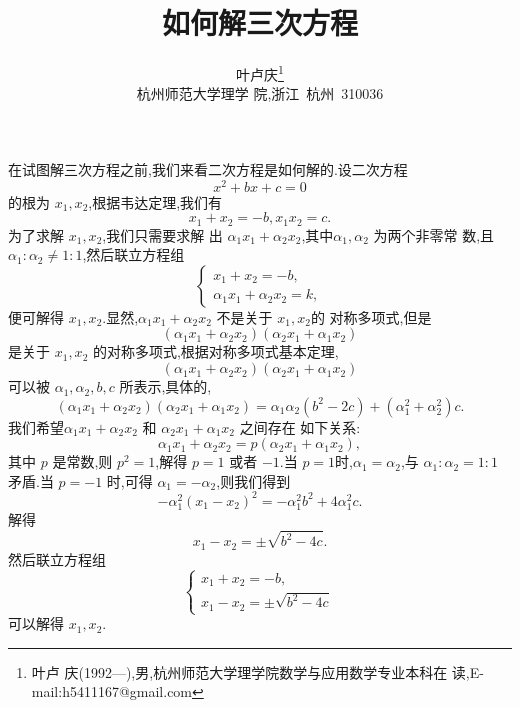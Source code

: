\documentclass[a4paper]{article}
\begin{document}
\title{\huge{\bf{如何解三次方程}}} \author{\small{叶卢庆\footnote{叶卢
      庆(1992---),男,杭州师范大学理学院数学与应用数学专业本科在
      读,E-mail:h5411167@gmail.com}}\\{\small{杭州师范大学理学
      院,浙江~杭州~310036}}}
\maketitle
在试图解三次方程之前,我们来看二次方程是如何解的.设二次方程
$$
x^2+bx+c=0
$$
的根为 $x_1,x_2$,根据韦达定理,我们有
$$
x_1+x_2=-b,x_1x_2=c.
$$
为了求解 $x_1,x_2$,我们只需要求解
出 $\alpha_1x_1+\alpha_2x_2$,其中$\alpha_1,\alpha_2$ 为两个非零常
数,且$\alpha_1:\alpha_2\neq 1:1$,然后联立方程组
$$
\begin{cases}
  x_1+x_2=-b,\\
  \alpha_1x_1+\alpha_2x_2=k,
\end{cases}
$$
便可解得 $x_1,x_2$.显然,$\alpha_1x_1+\alpha_2x_2$ 不是关于 $x_1,x_2$的
对称多项式,但是
$$
(\alpha_1x_1+\alpha_2x_2)(\alpha_2x_1+\alpha_1x_2)
$$
是关于 $x_1,x_2$ 的对称多项式,根据对称多项式基本定理,
$$
(\alpha_1x_1+\alpha_2x_2)(\alpha_2x_1+\alpha_1x_2)
$$
可以被 $\alpha_1,\alpha_2,b,c$ 所表示,具体的,
$$
(\alpha_1x_1+\alpha_2x_2)(\alpha_2x_1+\alpha_1x_2)=\alpha_1\alpha_2(b^2-2c)+(\alpha_1^2+\alpha_2^2)c.
$$
我们希望$\alpha_1x_1+\alpha_2x_2$ 和 $\alpha_2x_1+\alpha_1x_2$ 之间存在
如下关系:
$$
\alpha_1x_1+\alpha_2x_2=p(\alpha_2x_1+\alpha_1x_2),
$$
其中 $p$ 是常数,则 $p^2=1$,解得 $p=1$ 或者 $-1$.当
$p=1$时,$\alpha_1=\alpha_2$,与 $\alpha_1:\alpha_2=1:1$ 矛盾.当 $p=-1$
时,可得 $\alpha_1=-\alpha_2$,则我们得到
$$
-\alpha_1^2(x_1-x_2)^2=-\alpha_1^2b^2+4\alpha_1^2c.
$$
解得
$$
x_1-x_2=\pm\sqrt{b^2-4c}.
$$
然后联立方程组
$$
\begin{cases}
  x_1+x_2=-b,\\
  x_1-x_2=\pm \sqrt{b^2-4c}
\end{cases}
$$
可以解得 $x_1,x_2$.\\
\end{document}
